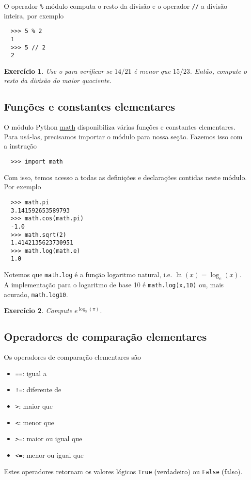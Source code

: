 \documentclass[12pt]{article}
\newtheorem{exr}{Exercício}[section]
\begin{document}
O operador \lstinline+%+ módulo computa o resto da divisão e o operador \lstinline+//+ a divisão inteira, por exemplo
\begin{lstlisting}
  >>> 5 % 2
  1
  >>> 5 // 2
  2
\end{lstlisting}

\begin{exr}
  Use o {\python} para verificar se $14/21$ é menor que $15/23$. Então, compute o resto da divisão do maior quociente.
\end{exr}

\subsection{Funções e constantes elementares}

O módulo Python \href{https://docs.python.org/3/library/math.html}{math} disponibiliza várias funções e constantes elementares. Para usá-las, precisamos importar o módulo para nossa seção. Fazemos isso com a instrução
\begin{lstlisting}
  >>> import math
\end{lstlisting}
Com isso, temos acesso a todas as definições e declarações contidas neste módulo. Por exemplo
\begin{lstlisting}
  >>> math.pi
  3.141592653589793
  >>> math.cos(math.pi)
  -1.0
  >>> math.sqrt(2)
  1.4142135623730951
  >>> math.log(math.e)
  1.0
\end{lstlisting}

\begin{obs}
  Notemos que \lstinline+math.log+ é a função logaritmo natural, i.e. $\ln(x) = \log_e(x)$. A implementação {\python} para o logaritmo de base 10 é \lstinline+math.log(x,10)+ ou, mais acurado, \lstinline+math.log10+.
\end{obs}

\begin{exr}
  Compute $e^{\log_3(\pi)}$.
\end{exr}

\subsection{Operadores de comparação elementares}

Os operadores de comparação elementares são
\begin{itemize}
\item[]\lstinline+==+: igual a
\item[]\lstinline+!=+: diferente de
\item[]\lstinline+>+: maior que
\item[]\lstinline+<+: menor que
\item[]\lstinline+>=+: maior ou igual que
\item[]\lstinline+<=+: menor ou igual que
\end{itemize}
Estes operadores retornam os valores lógicos \lstinline+True+ (verdadeiro) ou \lstinline+False+ (falso).
\end{document}
